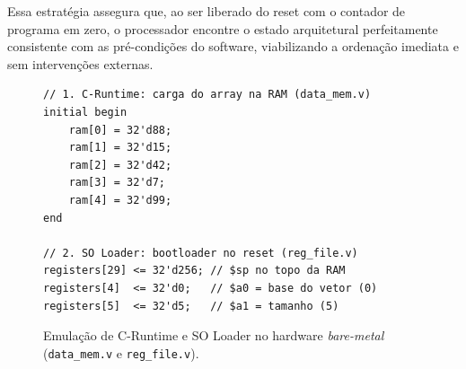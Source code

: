 Essa estratégia assegura que, ao ser liberado do reset com o contador de programa em zero, o processador encontre o estado arquitetural perfeitamente consistente com as pré-condições do software, viabilizando a ordenação imediata e sem intervenções externas.

\begin{figure}[htbp]
\centering
\begin{lstlisting}[style=estiloVerilog]
// 1. C-Runtime: carga do array na RAM (data_mem.v)
initial begin
    ram[0] = 32'd88;
    ram[1] = 32'd15;
    ram[2] = 32'd42;
    ram[3] = 32'd7;
    ram[4] = 32'd99;
end

// 2. SO Loader: bootloader no reset (reg_file.v)
registers[29] <= 32'd256; // $sp no topo da RAM
registers[4]  <= 32'd0;   // $a0 = base do vetor (0)
registers[5]  <= 32'd5;   // $a1 = tamanho (5)
\end{lstlisting}
\caption{Emulação de C-Runtime e SO Loader no hardware \textit{bare-metal} (\texttt{data\_mem.v} e \texttt{reg\_file.v}).}
\label{fig:baremetal_loader}
\end{figure}
